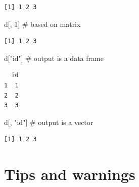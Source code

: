 \documentclass[
  letterpaper,
  DIV=11,
  numbers=noendperiod]{scrreprt}
\newenvironment{Shaded}{\begin{snugshade}}{\end{snugshade}}
\newcommand{\CommentTok}[1]{\textcolor[rgb]{0.37,0.37,0.37}{#1}}
\newcommand{\DecValTok}[1]{\textcolor[rgb]{0.68,0.00,0.00}{#1}}
\newcommand{\FunctionTok}[1]{\textcolor[rgb]{0.28,0.35,0.67}{#1}}
\newcommand{\NormalTok}[1]{\textcolor[rgb]{0.00,0.23,0.31}{#1}}
\newcommand{\OtherTok}[1]{\textcolor[rgb]{0.00,0.23,0.31}{#1}}
\newcommand{\SpecialCharTok}[1]{\textcolor[rgb]{0.37,0.37,0.37}{#1}}
\newcommand{\StringTok}[1]{\textcolor[rgb]{0.13,0.47,0.30}{#1}}
\begin{document}
\begin{verbatim}
[1] 1 2 3
\end{verbatim}

\begin{Shaded}
\begin{Highlighting}[]
\NormalTok{d[, }\DecValTok{1}\NormalTok{] }\CommentTok{\# based on matrix}
\end{Highlighting}
\end{Shaded}

\begin{verbatim}
[1] 1 2 3
\end{verbatim}

\begin{Shaded}
\begin{Highlighting}[]
\NormalTok{d[}\StringTok{"id"}\NormalTok{] }\CommentTok{\# output is a data frame}
\end{Highlighting}
\end{Shaded}

\begin{verbatim}
  id
1  1
2  2
3  3
\end{verbatim}

\begin{Shaded}
\begin{Highlighting}[]
\NormalTok{d[, }\StringTok{"id"}\NormalTok{] }\CommentTok{\# output is a vector}
\end{Highlighting}
\end{Shaded}

\begin{verbatim}
[1] 1 2 3
\end{verbatim}

\begin{Shaded}
\end{Shaded}

\section*{Tips and warnings}\label{tips-and-warnings-30}

\end{document}
